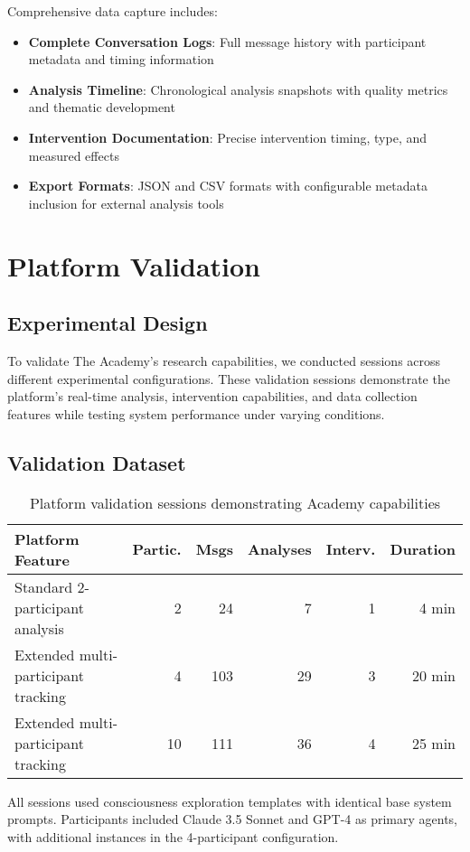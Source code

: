 \documentclass[11pt,letterpaper]{article}
\newcommand{\theacademy}{The Academy}
\begin{document}
Comprehensive data capture includes:

\begin{itemize}
    \item \textbf{Complete Conversation Logs}: Full message history with participant metadata and timing information
    \item \textbf{Analysis Timeline}: Chronological analysis snapshots with quality metrics and thematic development
    \item \textbf{Intervention Documentation}: Precise intervention timing, type, and measured effects
    \item \textbf{Export Formats}: JSON and CSV formats with configurable metadata inclusion for external analysis tools
\end{itemize}

\section{Platform Validation}

\subsection{Experimental Design}

To validate \theacademy{}'s research capabilities, we conducted sessions across different experimental configurations. These validation sessions demonstrate the platform's real-time analysis, intervention capabilities, and data collection features while testing system performance under varying conditions.

\subsection{Validation Dataset}

\begin{table}[h]
\centering
\begin{tabular}{lrrrrr}
\toprule
\textbf{Platform Feature} & \textbf{Partic.} & \textbf{Msgs} & \textbf{Analyses} & \textbf{Interv.} & \textbf{Duration} \\
\midrule
Standard 2-participant analysis & 2 & 24 & 7 & 1 & 4 min \\
Extended multi-participant tracking & 4 & 103 & 29 & 3 & 20 min \\
Extended multi-participant tracking & 10 & 111 & 36 & 4 & 25 min \\
\bottomrule
\end{tabular}
\caption{Platform validation sessions demonstrating Academy capabilities}
\label{tab:platform_validation}
\end{table}
All sessions used consciousness exploration templates with identical base system prompts. Participants included Claude 3.5 Sonnet and GPT-4 as primary agents, with additional instances in the 4-participant configuration.
\end{document}
